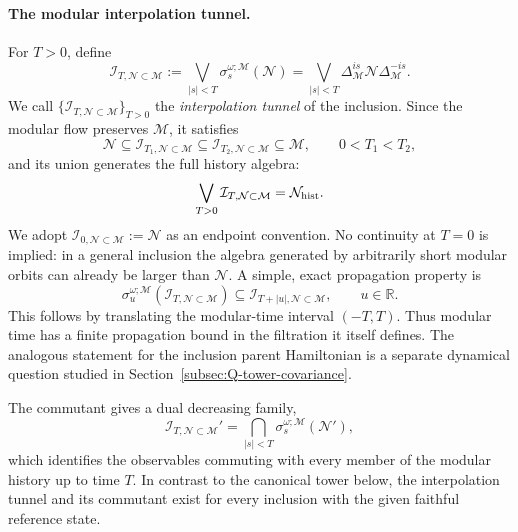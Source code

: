 \documentclass[a4paper,11pt]{article}
\theoremstyle{definition}
\newcommand{\mN}{\mathcal{N}}
\newcommand{\mI}{\mathcal{I}}
\newcommand{\mM}{\mathcal{M}}
\begin{document}
\paragraph{The modular interpolation tunnel.}
For $T>0$, define
\begin{equation}
 \boxed{\quad
 \mI_{T,\mN\subset\mM}
 :=\bigvee_{|s|<T}\sigma_s^{\omega;\mM}(\mN)
 =\bigvee_{|s|<T}\Delta_{\mM}^{is}\mN\Delta_{\mM}^{-is}.
 \quad}
 \label{eq:interpolation-tunnel}
\end{equation}
We call $\{\mI_{T,\mN\subset\mM}\}_{T>0}$ the
\emph{interpolation tunnel} of the inclusion. Since the modular flow
preserves $\mM$, it satisfies
\begin{equation}
 \mN\subseteq\mI_{T_1,\mN\subset\mM}
 \subseteq\mI_{T_2,\mN\subset\mM}\subseteq\mM,
 \qquad 0<T_1<T_2,
 \label{eq:interpolation-nesting}
\end{equation}
and its union generates the full history algebra:
\begin{equation}
 \bigvee_{T>0}\mI_{T,\mN\subset\mM}=\mN_{\rm hist}.
 \label{eq:interpolation-limit}
\end{equation}
We adopt $\mI_{0,\mN\subset\mM}:=\mN$ as an endpoint
convention. No continuity at $T=0$ is implied: in a general inclusion
the algebra generated by arbitrarily short modular orbits can already
be larger than $\mN$. A simple, exact propagation property is
\begin{equation}
 \boxed{\quad
 \sigma_u^{\omega;\mM}(\mI_{T,\mN\subset\mM})
 \subseteq\mI_{T+|u|,\mN\subset\mM},\qquad u\in\mathbb R.
 \quad}
 \label{eq:interpolation-modular-propagation}
\end{equation}
This follows by translating the modular-time interval $(-T,T)$.
Thus modular time has a finite propagation bound in the filtration it
itself defines. The analogous statement for the inclusion parent
Hamiltonian is a separate dynamical question studied in
Section~\ref{subsec:Q-tower-covariance}.

The commutant gives a dual decreasing family,
\begin{equation}
 \mI_{T,\mN\subset\mM}'
 =\bigcap_{|s|<T}\sigma_s^{\omega;\mM}(\mN'),
 \label{eq:interpolation-commutant}
\end{equation}
which identifies the observables commuting with every member of the
modular history up to time $T$. In contrast to the canonical tower
below, the interpolation tunnel and its commutant exist for every
inclusion with the given faithful reference state.
\end{document}
